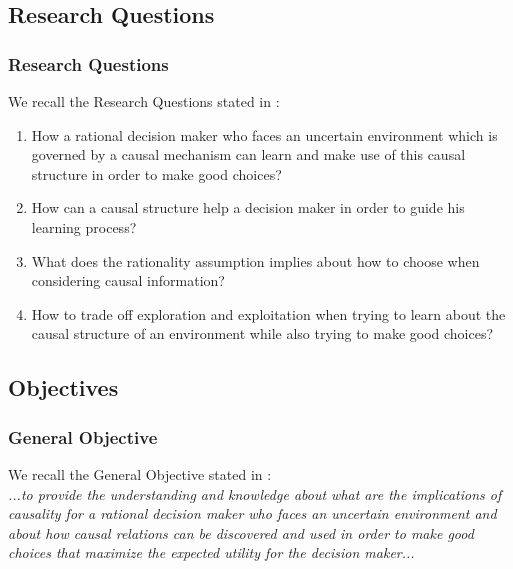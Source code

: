 \documentclass{beamer}
\theoremstyle{plain}
\begin{document}
\subsection{Research Questions}
\begin{frame}
\frametitle{Research Questions}
We recall the Research Questions stated in \cite{gonzalez2019causal}:
\begin{enumerate}
\item How a rational decision maker who faces an uncertain environment which is governed by a causal mechanism can learn and make use of this causal structure in order to make good choices? \item How can a causal structure help a decision maker in order to guide his learning process? 
\item What does the rationality assumption implies about how to choose when considering causal information? 
\item How to trade off exploration and exploitation when trying to learn about the causal structure of an environment while also trying to make good choices?
\end{enumerate}
\end{frame}

\subsection{Objectives}
\begin{frame}
\frametitle{General Objective}
We recall the General Objective stated in \cite{gonzalez2019causal}:
\\
\textit{...to provide the understanding and knowledge about what are the implications of causality for a rational decision maker who faces an uncertain environment and about how causal relations can be discovered and used in order to make good choices that maximize the expected utility for the decision maker...}
\end{frame}

\end{document}
